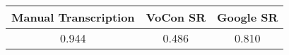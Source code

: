 \begin{tabular}{c|c|c}
Manual Transcription&VoCon SR&Google SR\\\hline
0.944&0.486&0.810\\
\end{tabular}
